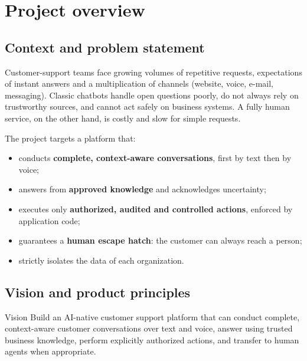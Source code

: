 \chapter{Project overview}

\section{Context and problem statement}
Customer-support teams face growing volumes of repetitive requests, expectations of instant answers and a multiplication of channels (website, voice, e-mail, messaging). Classic chatbots handle open questions poorly, do not always rely on trustworthy sources, and cannot act safely on business systems. A fully human service, on the other hand, is costly and slow for simple requests.

The project targets a platform that:
\begin{itemize}
  \item conducts \textbf{complete, context-aware conversations}, first by text then by voice;
  \item answers from \textbf{approved knowledge} and acknowledges uncertainty;
  \item executes only \textbf{authorized, audited and controlled actions}, enforced by application code;
  \item guarantees a \textbf{human escape hatch}: the customer can always reach a person;
  \item strictly isolates the data of each organization.
\end{itemize}

\section{Vision and product principles}
\begin{encadre}{Vision}
Build an AI-native customer support platform that can conduct complete, context-aware customer conversations over text and voice, answer using trusted business knowledge, perform explicitly authorized actions, and transfer to human agents when appropriate.
\end{encadre}

